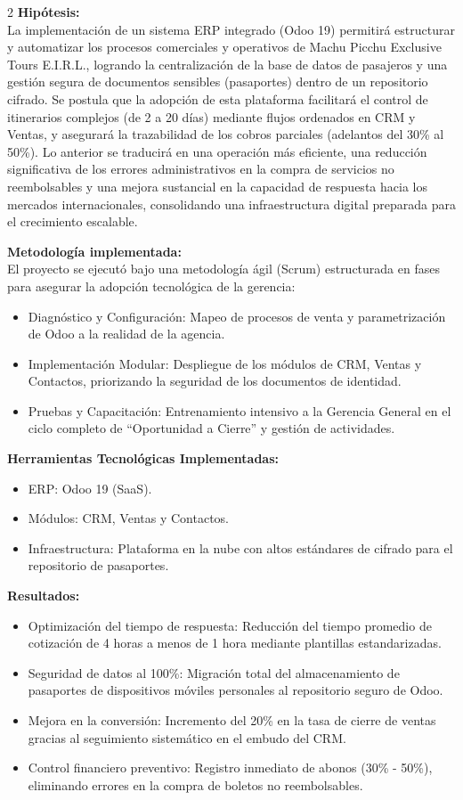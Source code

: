 \documentclass[12pt]{article}
\begin{document}
\begin{multicols}{2}
\textbf{Hipótesis:}\\
La implementación de un sistema ERP integrado (Odoo 19) permitirá estructurar y automatizar los procesos comerciales y operativos de Machu Picchu Exclusive Tours E.I.R.L., logrando la centralización de la base de datos de pasajeros y una gestión segura de documentos sensibles (pasaportes) dentro de un repositorio cifrado. Se postula que la adopción de esta plataforma facilitará el control de itinerarios complejos (de 2 a 20 días) mediante flujos ordenados en CRM y Ventas, y asegurará la trazabilidad de los cobros parciales (adelantos del 30\% al 50\%). Lo anterior se traducirá en una operación más eficiente, una reducción significativa de los errores administrativos en la compra de servicios no reembolsables y una mejora sustancial en la capacidad de respuesta hacia los mercados internacionales, consolidando una infraestructura digital preparada para el crecimiento escalable.

\textbf{Metodología implementada:}\\
El proyecto se ejecutó bajo una metodología ágil (Scrum) estructurada en fases para asegurar la adopción tecnológica de la gerencia:
\begin{itemize}
    \item Diagnóstico y Configuración: Mapeo de procesos de venta y parametrización de Odoo a la realidad de la agencia.
    \item Implementación Modular: Despliegue de los módulos de CRM, Ventas y Contactos, priorizando la seguridad de los documentos de identidad.
    \item Pruebas y Capacitación: Entrenamiento intensivo a la Gerencia General en el ciclo completo de ``Oportunidad a Cierre'' y gestión de actividades.
\end{itemize}

\textbf{Herramientas Tecnológicas Implementadas:}
\begin{itemize}
    \item ERP: Odoo 19 (SaaS).
    \item Módulos: CRM, Ventas y Contactos.
    \item Infraestructura: Plataforma en la nube con altos estándares de cifrado para el repositorio de pasaportes.
\end{itemize}

\textbf{Resultados:}
\begin{itemize}
    \item Optimización del tiempo de respuesta: Reducción del tiempo promedio de cotización de 4 horas a menos de 1 hora mediante plantillas estandarizadas.
    \item Seguridad de datos al 100\%: Migración total del almacenamiento de pasaportes de dispositivos móviles personales al repositorio seguro de Odoo.
    \item Mejora en la conversión: Incremento del 20\% en la tasa de cierre de ventas gracias al seguimiento sistemático en el embudo del CRM.
    \item Control financiero preventivo: Registro inmediato de abonos (30\% - 50\%), eliminando errores en la compra de boletos no reembolsables.
\end{itemize}


\end{multicols}
\end{document}
